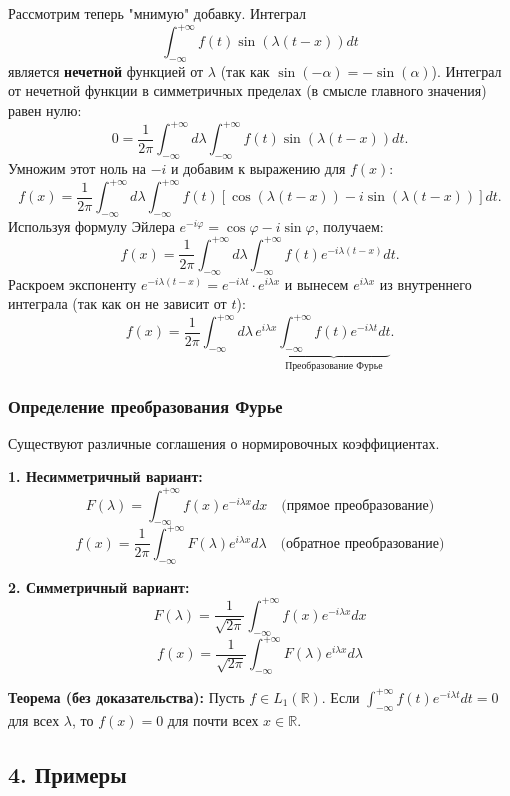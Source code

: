 \documentclass[12pt,a4paper,openany]{book}
\begin{document}
Рассмотрим теперь "мнимую" добавку. Интеграл
$$
\int_{-\infty}^{+\infty} f(t) \sin(\lambda(t-x)) dt
$$
является \textbf{нечетной} функцией от $\lambda$ (так как $\sin(-\alpha) = -\sin(\alpha)$). Интеграл от нечетной функции в симметричных пределах (в смысле главного значения) равен нулю:
$$
0 = \frac{1}{2\pi} \int_{-\infty}^{+\infty} d\lambda \int_{-\infty}^{+\infty} f(t) \sin(\lambda(t-x)) dt.
$$
Умножим этот ноль на $-i$ и добавим к выражению для $f(x)$:
$$
f(x) = \frac{1}{2\pi} \int_{-\infty}^{+\infty} d\lambda \int_{-\infty}^{+\infty} f(t) \left[ \cos(\lambda(t-x)) - i \sin(\lambda(t-x)) \right] dt.
$$
Используя формулу Эйлера $e^{-i\varphi} = \cos \varphi - i \sin \varphi$, получаем:
$$
f(x) = \frac{1}{2\pi} \int_{-\infty}^{+\infty} d\lambda \int_{-\infty}^{+\infty} f(t) e^{-i\lambda(t-x)} dt.
$$
Раскроем экспоненту $e^{-i\lambda(t-x)} = e^{-i\lambda t} \cdot e^{i\lambda x}$ и вынесем $e^{i\lambda x}$ из внутреннего интеграла (так как он не зависит от $t$):
\begin{equation}
    f(x) = \frac{1}{2\pi} \int_{-\infty}^{+\infty} d\lambda \, e^{i\lambda x} \underbrace{\int_{-\infty}^{+\infty} f(t) e^{-i\lambda t} dt}_{\text{Преобразование Фурье}}.
\end{equation}

\subsubsection{Определение преобразования Фурье}
Существуют различные соглашения о нормировочных коэффициентах.

\textbf{1. Несимметричный вариант:}
$$
F(\lambda) = \int_{-\infty}^{+\infty} f(x) e^{-i\lambda x} dx \quad \text{(прямое преобразование)}
$$
$$
f(x) = \frac{1}{2\pi} \int_{-\infty}^{+\infty} F(\lambda) e^{i\lambda x} d\lambda \quad \text{(обратное преобразование)}
$$

\textbf{2. Симметричный вариант:}
$$
F(\lambda) = \frac{1}{\sqrt{2\pi}} \int_{-\infty}^{+\infty} f(x) e^{-i\lambda x} dx
$$
$$
f(x) = \frac{1}{\sqrt{2\pi}} \int_{-\infty}^{+\infty} F(\lambda) e^{i\lambda x} d\lambda
$$

\textbf{Теорема (без доказательства):}
Пусть $f \in L_1(\mathbb{R})$. Если $\int_{-\infty}^{+\infty} f(t) e^{-i\lambda t} dt = 0$ для всех $\lambda$, то $f(x) = 0$ для почти всех $x \in \mathbb{R}$.

\subsection{4. Примеры}
\end{document}
